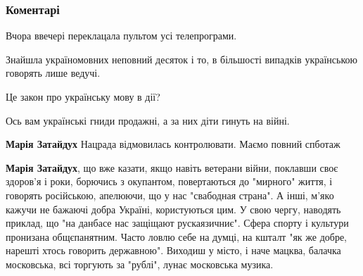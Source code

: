  
 
 
 
 
\subsubsection{Коментарі}
\label{sec:30_07_2021.fb.smolij_andrij.1.zapret_ukraina_jazyk_kultura.cmt}

\begin{itemize}
 
Вчора ввечері переклацала пультом усі телепрограми.

Знайшла україномовних неповний десяток і то, в більшості випадків українською
говорять лише ведучі.

Це закон про українську мову в дії?

Ось вам українські гниди продажні, а за них діти гинуть на війні.

\begin{itemize}
 
\textbf{Марія Затайдух} Нацрада відмовилась контролювати. Маємо повний спботаж

 
\textbf{Марія Затайдух}, що вже казати, якщо навіть ветерани війни, поклавши
своє здоров'я і роки, борючись з окупантом, повертаються до "мирного" життя, і
говорять російською, апелюючи, що у нас "свабодная страна". А інші, м'яко
кажучи не бажаючі добра Україні, користуються цим. У свою чергу, наводять
приклад, що "на данбасе нас защіщают рускаязичниє". Сфера спорту і культури
пронизана общєпанятним.  Часто ловлю себе на думці, на кшталт "як же добре,
нарешті хтось говорить державною". Виходиш у місто, і наче мацква, балачка
московська, всі торгують за "рублі", лунає московська музика.


\end{itemize}
\end{itemize}
